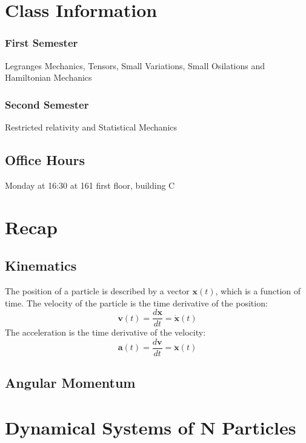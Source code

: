 \section*{Class Information}

\subsubsection*{First Semester}
Legranges Mechanics, Tensors, Small Variations, Small Osilations and Hamiltonian Mechanics

\subsubsection*{Second Semester}
Restricted relativity and Statistical Mechanics

\subsection*{Office Hours}
Monday at 16:30 at 161 first floor, building C

\section{Recap}

\subsection{Kinematics}
The position of a particle is described by a vector $\mathbf{x}(t)$, which is a function of time. The velocity of the particle is the time derivative of the position:
\begin{equation}
    \mathbf{v}(t) = \frac{d\mathbf{x}}{dt} = \dot{\mathbf{x}}(t)
\end{equation}
The acceleration is the time derivative of the velocity:
\begin{equation}
    \mathbf{a}(t) = \frac{d\mathbf{v}}{dt} = \ddot{\mathbf{x}}(t)
\end{equation}

\subsection{Angular Momentum}


\section{Dynamical Systems of N Particles}

